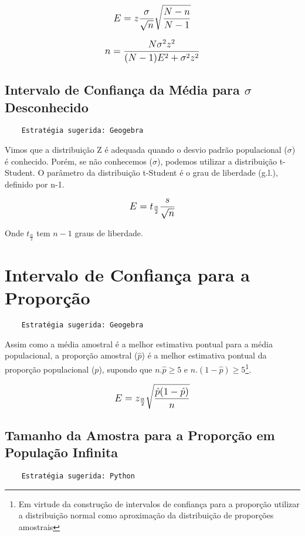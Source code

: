 \[\beq{ E = z\frac{\sigma}{\sqrt{n}}\sqrt{\frac{N-n}{N-1}} }\]

\[\beq{ n = \frac{N\sigma^2z^2}{(N-1)E^2+\sigma^2z^2} }\]

\subsection{Intervalo de Confiança da Média para \(\sigma\) Desconhecido}

\begin{verbatim}
	Estratégia sugerida: Geogebra
\end{verbatim}

Vimos que a distribuição Z é adequada quando o desvio padrão populacional (\(\sigma\)) é conhecido. Porém, se não conhecemos (\(\sigma\)), podemos utilizar a distribuição t-Student. O parâmetro da distribuição t-Student é o grau de liberdade (g.l.), definido
por n-1.

\[\beq{ E = t_\frac{\alpha}{2}\frac{s}{\sqrt{n}} }\]

Onde \(t_\frac{\alpha}{2}\) tem \(n-1\) graus de liberdade.

\section{Intervalo de Confiança para a Proporção}

\begin{verbatim}
	Estratégia sugerida: Geogebra
\end{verbatim}

Assim como a média amostral é a melhor estimativa pontual para a média populacional, a proporção amostral (\(\hat{p}\)) é a melhor estimativa pontual da proporção populacional (\({p}\)), supondo que \(n.\hat{p}\geq5\) e \(n.(1-\hat{p})\geq5\)\footnote{Em virtude da construção de intervalos de confiança para a proporção utilizar a distribuição normal como aproximação da distribuição de proporções amostrais}.

\[\beq{ E = z_\frac{\alpha}{2}\sqrt{\frac{\hat{p}(1-\hat{p})}{n}} }\]

\subsection{Tamanho da Amostra para a Proporção em População Infinita}

\begin{verbatim}
	Estratégia sugerida: Python
\end{verbatim}

